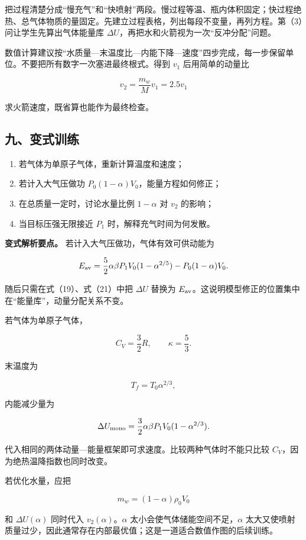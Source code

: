 \documentclass[12pt,a4paper,UTF8]{ctexart}
\newcommand{\tightlist}{\setlength{\itemsep}{0pt}\setlength{\parskip}{0pt}}
\begin{document}
把过程清楚分成``慢充气''和``快喷射''两段。慢过程等温、瓶内体积固定；快过程绝热、总气体物质的量固定。先建立过程表格，列出每段不变量，再列方程。第（3）问让学生先算出气体能量库
\(\Delta U\)，再把水和火箭视为一次``反冲分配''问题。

数值计算建议按``水质量---末温度比---内能下降---速度''四步完成，每一步保留单位。不要把所有数字一次塞进最终根式。得到
\(v_1\) 后用简单的动量比

\[
v_2=\frac{m_w}{M}v_1=2.5v_1
\]

求火箭速度，既省算也能作为最终检查。

\subsection{九、变式训练}\label{ux4e5dux53d8ux5f0fux8badux7ec3-6}

\begin{enumerate}
\def\labelenumi{\arabic{enumi}.}
\tightlist
\item
  若气体为单原子气体，重新计算温度和速度；
\item
  若计入大气压做功 \(P_0(1-\alpha)V_0\)，能量方程如何修正；
\item
  在总质量一定时，讨论水量比例 \(1-\alpha\) 对 \(v_2\) 的影响；
\item
  当目标压强无限接近 \(P_1\) 时，解释充气时间为何发散。
\end{enumerate}

\textbf{变式解析要点。} 若计入大气压做功，气体有效可供动能为

\[
E_{\rm av}
=\frac52\alpha\beta P_1V_0
(1-\alpha^{2/5})
-P_0(1-\alpha)V_0.
\]

随后只需在式（19）、式（21）中把 \(\Delta U\) 替换为
\(E_{\rm av}\)。这说明模型修正的位置集中在``能量库''，动量分配关系不变。

若气体为单原子气体，

\[
C_V=\frac32R,
\qquad
\kappa=\frac53.
\]

末温度为

\[
T_f=T_0\alpha^{2/3},
\]

内能减少量为

\[
\Delta U_{\rm mono}
=\frac32\alpha\beta P_1V_0
(1-\alpha^{2/3}).
\]

代入相同的两体动量---能量框架即可求速度。比较两种气体时不能只比较
\(C_V\)，因为绝热温降指数也同时改变。

若优化水量，应把

\[
m_w=(1-\alpha)\rho_0V_0
\]

和 \(\Delta U(\alpha)\) 同时代入 \(v_2(\alpha)\)。\(\alpha\)
太小会使气体储能空间不足，\(\alpha\)
太大又使喷射质量过少，因此通常存在内部最优值；这是一道适合数值作图的后续训练。
\end{document}
